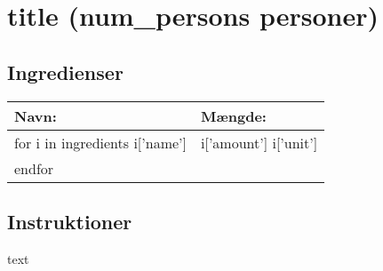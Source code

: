 \section{ {{title}} ({{num_persons}} personer)}

\subsection*{Ingredienser}

\begin{tabular}{|l|l|}
  \hline
  \bf{Navn:} & \bf{Mængde:} \\
  \hline\hline

  {{for i in ingredients}}
    {{i['name']}} & {{i['amount']}} {{i['unit']}} \\
  {{endfor}}

  \hline
\end{tabular}

\subsection*{Instruktioner}

{{text}}


